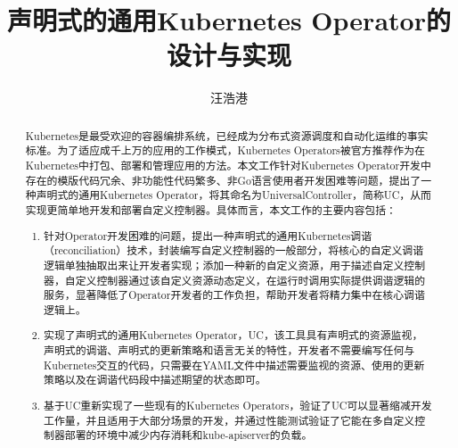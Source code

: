 \documentclass[macfonts,master]{njuthesis}
\title{声明式的通用Kubernetes Operator的设计与实现}
\author{汪浩港}
\institute{南京大学}
\begin{document}

\maketitle
\makeenglishtitle


\frontmatter

\begin{abstract}
Kubernetes是最受欢迎的容器编排系统，已经成为分布式资源调度和自动化运维的事实标准。为了适应成千上万的应用的工作模式，Kubernetes Operators被官方推荐作为在Kubernetes中打包、部署和管理应用的方法。本文工作针对Kubernetes Operator开发中存在的模版代码冗余、非功能性代码繁多、非Go语言使用者开发困难等问题，提出了一种声明式的通用Kubernetes Operator，将其命名为UniversalController，简称UC，从而实现更简单地开发和部署自定义控制器。具体而言，本文工作的主要内容包括：
\begin{enumerate}
	\item 针对Operator开发困难的问题，提出一种声明式的通用Kubernetes调谐（reconciliation）技术，封装编写自定义控制器的一般部分，将核心的自定义调谐逻辑单独抽取出来让开发者实现；添加一种新的自定义资源，用于描述自定义控制器，自定义控制器通过该自定义资源动态定义，在运行时调用实际提供调谐逻辑的服务，显著降低了Operator开发者的工作负担，帮助开发者将精力集中在核心调谐逻辑上。
	\item 实现了声明式的通用Kubernetes Operator，UC，该工具具有声明式的资源监视，声明式的调谐、声明式的更新策略和语言无关的特性，开发者不需要编写任何与Kubernetes交互的代码，只需要在YAML文件中描述需要监视的资源、使用的更新策略以及在调谐代码段中描述期望的状态即可。
	\item 基于UC重新实现了一些现有的Kubernetes Operators，验证了UC可以显著缩减开发工作量，并且适用于大部分场景的开发，并通过性能测试验证了它能在多自定义控制器部署的环境中减少内存消耗和kube-apiserver的负载。
\end{enumerate}

\end{abstract}
\end{document}
